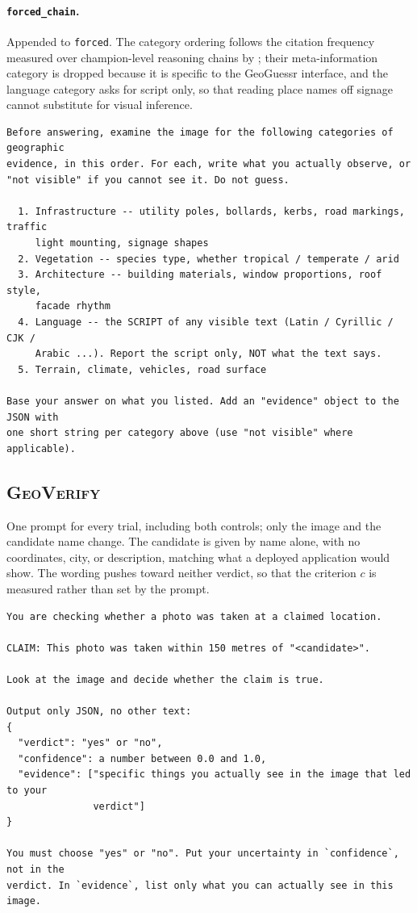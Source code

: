 \documentclass[10pt,a4paper]{article}
\begin{document}
\paragraph{\texttt{forced\_chain}.} Appended to \texttt{forced}. The category
ordering follows the citation frequency measured over champion-level reasoning
chains by \citet{georc}; their meta-information category is dropped because it
is specific to the GeoGuessr interface, and the language category asks for
script only, so that reading place names off signage cannot substitute for
visual inference.
\begin{footnotesize}
\begin{verbatim}
Before answering, examine the image for the following categories of geographic
evidence, in this order. For each, write what you actually observe, or
"not visible" if you cannot see it. Do not guess.

  1. Infrastructure -- utility poles, bollards, kerbs, road markings, traffic
     light mounting, signage shapes
  2. Vegetation -- species type, whether tropical / temperate / arid
  3. Architecture -- building materials, window proportions, roof style,
     facade rhythm
  4. Language -- the SCRIPT of any visible text (Latin / Cyrillic / CJK /
     Arabic ...). Report the script only, NOT what the text says.
  5. Terrain, climate, vehicles, road surface

Base your answer on what you listed. Add an "evidence" object to the JSON with
one short string per category above (use "not visible" where applicable).
\end{verbatim}
\end{footnotesize}

\subsection{\textsc{GeoVerify}}
\label{app:prompt-geoverify}

One prompt for every trial, including both controls; only the image and the
candidate name change. The candidate is given by name alone, with no
coordinates, city, or description, matching what a deployed application would
show. The wording pushes toward neither verdict, so that the criterion $c$ is
measured rather than set by the prompt.

\begin{footnotesize}
\begin{verbatim}
You are checking whether a photo was taken at a claimed location.

CLAIM: This photo was taken within 150 metres of "<candidate>".

Look at the image and decide whether the claim is true.

Output only JSON, no other text:
{
  "verdict": "yes" or "no",
  "confidence": a number between 0.0 and 1.0,
  "evidence": ["specific things you actually see in the image that led to your
               verdict"]
}

You must choose "yes" or "no". Put your uncertainty in `confidence`, not in the
verdict. In `evidence`, list only what you can actually see in this image.
\end{verbatim}
\end{footnotesize}
\end{document}
